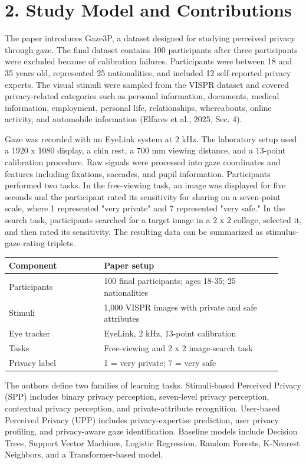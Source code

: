\documentclass[11pt,a4paper]{article}
\begin{document}
\section*{2. Study Model and Contributions}

The paper introduces Gaze3P, a dataset designed for studying perceived privacy through gaze. The final dataset contains 100 participants after three participants were excluded because of calibration failures. Participants were between 18 and 35 years old, represented 25 nationalities, and included 12 self-reported privacy experts. The visual stimuli were sampled from the VISPR dataset and covered privacy-related categories such as personal information, documents, medical information, employment, personal life, relationships, whereabouts, online activity, and automobile information (Elfares et al., 2025, Sec. 4).


Gaze was recorded with an EyeLink system at 2 kHz. The laboratory setup used a 1920 x 1080 display, a chin rest, a 700 mm viewing distance, and a 13-point calibration procedure. Raw signals were processed into gaze coordinates and features including fixations, saccades, and pupil information. Participants performed two tasks. In the free-viewing task, an image was displayed for five seconds and the participant rated its sensitivity for sharing on a seven-point scale, where 1 represented "very private" and 7 represented "very safe." In the search task, participants searched for a target image in a 2 x 2 collage, selected it, and then rated its sensitivity. The resulting data can be summarized as stimulus-gaze-rating triplets.


\par\vspace{3pt}
{\footnotesize\begin{longtable}{@{}p{0.32\linewidth} p{0.60\linewidth}@{}}
\toprule
\textbf{Component} & \textbf{Paper setup} \\
\midrule
Participants & 100 final participants; ages 18-35; 25 nationalities \\
Stimuli & 1,000 VISPR images with private and safe attributes \\
Eye tracker & EyeLink, 2 kHz, 13-point calibration \\
Tasks & Free-viewing and 2 x 2 image-search task \\
Privacy label & 1 = very private; 7 = very safe \\
\bottomrule\end{longtable}}
The authors define two families of learning tasks. Stimuli-based Perceived Privacy (SPP) includes binary privacy perception, seven-level privacy perception, contextual privacy perception, and private-attribute recognition. User-based Perceived Privacy (UPP) includes privacy-expertise prediction, user privacy profiling, and privacy-aware gaze identification. Baseline models include Decision Trees, Support Vector Machines, Logistic Regression, Random Forests, K-Nearest Neighbors, and a Transformer-based model.
\end{document}
